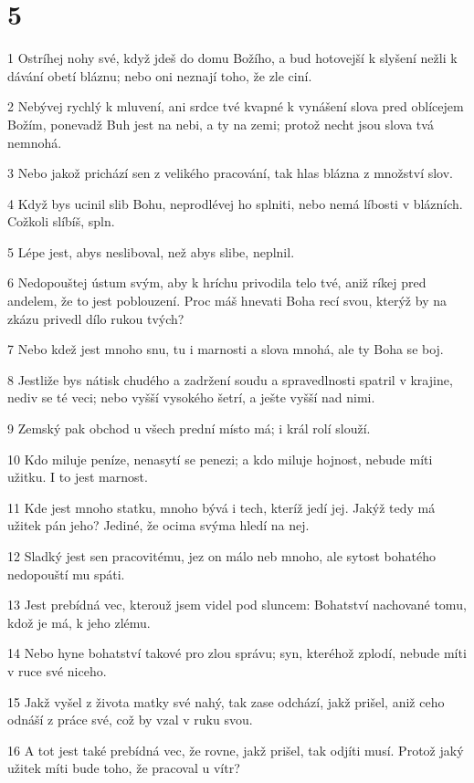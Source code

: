 \chapter{5}

\par 1 Ostríhej nohy své, když jdeš do domu Božího, a bud hotovejší k slyšení nežli k dávání obetí bláznu; nebo oni neznají toho, že zle ciní.
\par 2 Nebývej rychlý k mluvení, ani srdce tvé kvapné k vynášení slova pred oblícejem Božím, ponevadž Buh jest na nebi, a ty na zemi; protož necht jsou slova tvá nemnohá.
\par 3 Nebo jakož prichází sen z velikého pracování, tak hlas blázna z množství slov.
\par 4 Když bys ucinil slib Bohu, neprodlévej ho splniti, nebo nemá líbosti v blázních. Cožkoli slíbíš, spln.
\par 5 Lépe jest, abys nesliboval, než abys slibe, neplnil.
\par 6 Nedopouštej ústum svým, aby k hríchu privodila telo tvé, aniž ríkej pred andelem, že to jest poblouzení. Proc máš hnevati Boha recí svou, kterýž by na zkázu privedl dílo rukou tvých?
\par 7 Nebo kdež jest mnoho snu, tu i marnosti a slova mnohá, ale ty Boha se boj.
\par 8 Jestliže bys nátisk chudého a zadržení soudu a spravedlnosti spatril v krajine, nediv se té veci; nebo vyšší vysokého šetrí, a ješte vyšší nad nimi.
\par 9 Zemský pak obchod u všech prední místo má; i král rolí slouží.
\par 10 Kdo miluje peníze, nenasytí se penezi; a kdo miluje hojnost, nebude míti užitku. I to jest marnost.
\par 11 Kde jest mnoho statku, mnoho bývá i tech, kteríž jedí jej. Jakýž tedy má užitek pán jeho? Jediné, že ocima svýma hledí na nej.
\par 12 Sladký jest sen pracovitému, jez on málo neb mnoho, ale sytost bohatého nedopouští mu spáti.
\par 13 Jest prebídná vec, kterouž jsem videl pod sluncem: Bohatství nachované tomu, kdož je má, k jeho zlému.
\par 14 Nebo hyne bohatství takové pro zlou správu; syn, kteréhož zplodí, nebude míti v ruce své niceho.
\par 15 Jakž vyšel z života matky své nahý, tak zase odchází, jakž prišel, aniž ceho odnáší z práce své, což by vzal v ruku svou.
\par 16 A tot jest také prebídná vec, že rovne, jakž prišel, tak odjíti musí. Protož jaký užitek míti bude toho, že pracoval u vítr?
